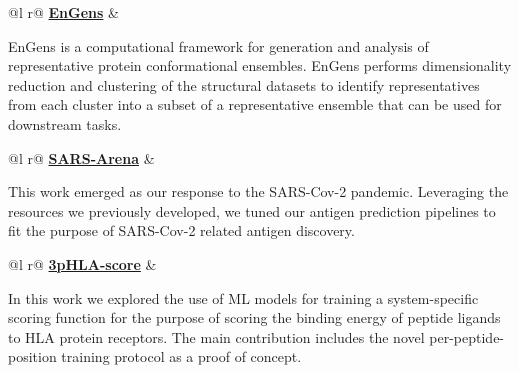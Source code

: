 \documentclass[a4paper,12pt]{article}
\begin{document}
\begin{tabularx}{\linewidth}{ @{}l r@{} }
 \href{https://github.com/KavrakiLab/EnGens}{\faGithub \textbf{EnGens}} &\\[3.75pt]
\begin{minipage}[t]{\linewidth}
EnGens is a computational framework for generation and analysis of representative protein conformational ensembles. EnGens performs dimensionality reduction and clustering of the structural datasets to identify representatives from each cluster into a subset of a representative ensemble that can be used for downstream tasks. %
\end{minipage}
\end{tabularx}

\begin{tabularx}{\linewidth}{ @{}l r@{} }
 \href{https://github.com/KavrakiLab/SARS-Arena}{\faGithub \textbf{SARS-Arena}} &\\[3.75pt]
\begin{minipage}[t]{\linewidth}
This work emerged as our response to the SARS-Cov-2 pandemic. Leveraging the resources we previously developed, we tuned our antigen prediction pipelines to fit the purpose of SARS-Cov-2 related antigen discovery. %
\end{minipage}
\end{tabularx}

\begin{tabularx}{\linewidth}{ @{}l r@{} }
 \href{https://github.com/KavrakiLab/3pHLA-score}{\faGithub \textbf{3pHLA-score}} &\\[3.75pt]
\begin{minipage}[t]{\linewidth}
In this work we explored the use of ML models for training a system-specific scoring function for the purpose of scoring the binding energy of peptide ligands to HLA protein receptors. The main contribution includes the novel per-peptide-position training protocol as a proof of concept. %
\end{minipage}
\end{tabularx}
\end{document}
